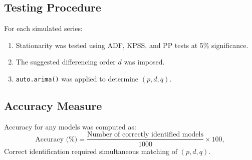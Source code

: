 \documentclass[twoside]{article}
\begin{document}
\subsection{Testing Procedure}
\hspace{4mm}
For each simulated series:
\begin{enumerate}
\item Stationarity was tested using ADF, KPSS, and PP tests at 5\% significance.
\item The suggested differencing order $d$ was imposed.
\item \texttt{auto.arima()} was applied to determine $(p,d,q)$.
\end{enumerate}
\subsection{Accuracy Measure}

Accuracy for any models was computed as:
$$
\text{Accuracy (\%)} = 
\frac{\text{Number of correctly identified models}}{1000} \times 100,
$$
Correct identification required simultaneous matching of $(p,d,q)$.
\end{document}
